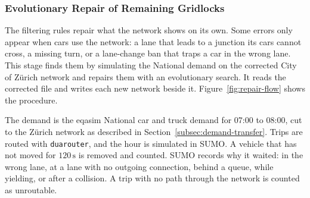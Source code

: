 
\subsubsection{Evolutionary Repair of Remaining Gridlocks}
\label{subsubsec:evolutionary-turns}

The filtering rules repair what the network shows on its own. Some
errors only appear when cars use the network: a lane that leads to a
junction its cars cannot cross, a missing turn, or a lane-change ban
that traps a car in the wrong lane. This stage finds them by simulating
the National demand on the corrected City of Zürich network and
repairs them with an evolutionary search. It reads the corrected file
and writes each new network beside it. Figure~\ref{fig:repair-flow}
shows the procedure.

The demand is the eqasim National car and truck demand for 07:00 to
08:00, cut to the Zürich network as described in
Section~\ref{subsec:demand-transfer}. Trips are routed with
\texttt{duarouter}, and the hour is simulated in SUMO. A vehicle that
has not moved for \(120\,\mathrm{s}\) is removed and counted. SUMO
records why it waited: in the wrong lane, at a lane with no outgoing
connection, behind a queue, while yielding, or after a collision. A
trip with no path through the network is counted as unroutable.

